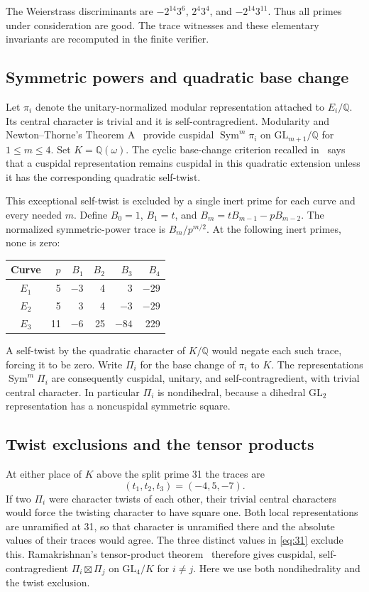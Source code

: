 \documentclass[11pt]{article}
\theoremstyle{definition}\newtheorem{definition}[theorem]{Definition}
\newcommand{\Q}{\mathbb Q}
\newcommand{\Sym}{\operatorname{Sym}}
\begin{document}
The Weierstrass discriminants are
$-2^{14}3^6$, $2^4 3^4$, and $-2^{14}3^{11}$.
Thus all primes under consideration are good.
The trace witnesses and these elementary invariants are
recomputed in the finite verifier.

\subsection{Symmetric powers and quadratic base change}
Let $\pi_i$ denote the unitary-normalized modular
representation attached to $E_i/\Q$. Its central character
is trivial and it is self-contragredient.
Modularity and Newton--Thorne's Theorem A~\cite{newtonthorne}
provide cuspidal $\Sym^m\pi_i$ on $\mathrm{GL}_{m+1}/\Q$
for $1\le m\le4$.
Set $K=\Q(\omega)$. The cyclic base-change criterion
recalled in~\cite[Proposition 2.3.1(5), p.~54]{ramakrishnan} says that a
cuspidal representation remains cuspidal in this quadratic
extension unless it has the corresponding quadratic
self-twist.

This exceptional self-twist is excluded by a single inert
prime for each curve and every needed $m$.
Define $B_0=1$, $B_1=t$, and
$B_m=tB_{m-1}-pB_{m-2}$.
The normalized symmetric-power trace is $B_m/p^{m/2}$.
At the following inert primes, none is zero:
\begin{center}
\begin{tabular}{c r rrrr}
\toprule
Curve&$p$&$B_1$&$B_2$&$B_3$&$B_4$\\
\midrule
$E_1$&5&$-3$&4&3&$-29$\\
$E_2$&5&3&4&$-3$&$-29$\\
$E_3$&11&$-6$&25&$-84$&229\\
\bottomrule
\end{tabular}
\end{center}
A self-twist by the quadratic character of $K/\Q$
would negate each such trace, forcing it to be zero.
Write $\Pi_i$ for the base change of $\pi_i$ to $K$.
The representations $\Sym^m\Pi_i$ are consequently
cuspidal, unitary, and self-contragredient, with trivial
central character. In particular $\Pi_i$ is nondihedral,
because a dihedral $\mathrm{GL}_2$ representation has a
noncuspidal symmetric square.

\subsection{Twist exclusions and the tensor products}
At either place of $K$ above the split prime 31 the traces
are
\begin{equation}\label{eq:31}
 (t_1,t_2,t_3)=(-4,5,-7).
\end{equation}
If two $\Pi_i$ were character twists of each other, their
trivial central characters would force the twisting
character to have square one. Both local representations
are unramified at 31, so that character is unramified there
and the absolute values of their traces would agree.
The three distinct values in \eqref{eq:31} exclude this.
Ramakrishnan's tensor-product theorem~\cite[Theorem M]{ramakrishnan}
therefore gives cuspidal, self-contragredient
$\Pi_i\boxtimes\Pi_j$ on $\mathrm{GL}_4/K$ for $i\ne j$.
Here we use both nondihedrality and the twist exclusion.
\end{document}
